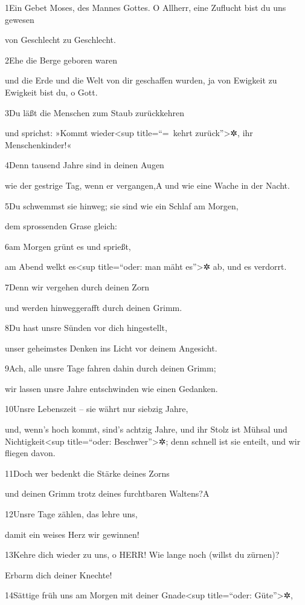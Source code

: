 1Ein Gebet Moses, des Mannes Gottes. O Allherr, eine Zuflucht bist du
uns gewesen

von Geschlecht zu Geschlecht.

2Ehe die Berge geboren waren

und die Erde und die Welt von dir geschaffen wurden, ja von Ewigkeit zu
Ewigkeit bist du, o Gott.

3Du läßt die Menschen zum Staub zurückkehren

und sprichst: »Kommt wieder\textless sup title=``=~kehrt
zurück''\textgreater✲, ihr Menschenkinder!«

4Denn tausend Jahre sind in deinen Augen

wie der gestrige Tag, wenn er vergangen,{A} und wie eine Wache in der
Nacht.

5Du schwemmst sie hinweg; sie sind wie ein Schlaf am Morgen,

dem sprossenden Grase gleich:

6am Morgen grünt es und sprießt,

am Abend welkt es\textless sup title=``oder: man mäht es''\textgreater✲
ab, und es verdorrt.

7Denn wir vergehen durch deinen Zorn

und werden hinweggerafft durch deinen Grimm.

8Du hast unsre Sünden vor dich hingestellt,

unser geheimstes Denken ins Licht vor deinem Angesicht.

9Ach, alle unsre Tage fahren dahin durch deinen Grimm;

wir lassen unsre Jahre entschwinden wie einen Gedanken.

10Unsre Lebenszeit -- sie währt nur siebzig Jahre,

und, wenn's hoch kommt, sind's achtzig Jahre, und ihr Stolz ist Mühsal
und Nichtigkeit\textless sup title=``oder: Beschwer''\textgreater✲; denn
schnell ist sie enteilt, und wir fliegen davon.

11Doch wer bedenkt die Stärke deines Zorns

und deinen Grimm trotz deines furchtbaren Waltens?{A}

12Unsre Tage zählen, das lehre uns,

damit ein weises Herz wir gewinnen!

13Kehre dich wieder zu uns, o HERR! Wie lange noch (willst du zürnen)?

Erbarm dich deiner Knechte!

14Sättige früh uns am Morgen mit deiner Gnade\textless sup title=``oder:
Güte''\textgreater✲,

